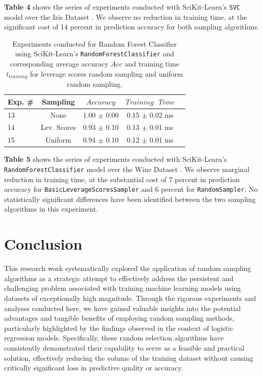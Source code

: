 \documentclass{article}
\theoremstyle{plain}
\theoremstyle{definition}
\theoremstyle{remark}
\begin{document}
\textbf{Table 4} shows the series of experiments conducted with SciKit-Learn's \texttt{SVC} model over the Iris Dataset \cite{iris}. We observe no reduction in training time, at the significant cost of 14 percent in prediction accuracy for both sampling algorithms.

\begin{table}[t]
	\caption{Experiments conducted for Random Forest Classifier using SciKit-Learn's \texttt{RandomForestClassifier} and corresponding average accuracy $Acc$ and training time $t_{training}$ for leverage scores random sampling and uniform random sampling.}
	\label{t5}
	\vskip 0.15in
	\begin{center}
		\begin{small}
			\begin{sc}
				\begin{tabular}{lcccr}
					\toprule
					Exp. \# & Sampling & $Accuracy$ & $Training \text{ } Time$\\
					\midrule
					13 & None & 1.00 $\pm$ 0.00 & 0.15 $\pm$ 0.02 ms \\
					14 & Lev. Scores & 0.93 $\pm$ 0.10 & 0.13 $\pm$ 0.01 ms \\
					15 & Uniform & 0.94 $\pm$ 0.10 & 0.12 $\pm$ 0.01 ms \\
					\bottomrule
				\end{tabular}
			\end{sc}
		\end{small}
	\end{center}
	\vskip -0.1in
\end{table}

\textbf{Table 5} shows the series of experiments conducted with SciKit-Learn's \texttt{RandomForestClassifier} model over the Wine Dataset \cite{wine}. We observe marginal reduction in training time, at the substantial cost of 7 percent in prediction accuracy for \texttt{BasicLeverageScoresSampler} and 6 percent for \texttt{RandomSampler}. No statistically significant differences have been identified between the two sampling algorithms in this experiment.


\section{Conclusion}

This research work systematically explored the application of random sampling algorithms as a strategic attempt to effectively address the persistent and challenging problem associated with training machine learning models using datasets of exceptionally high magnitude. Through the rigorous experiments and analyses conducted here, we have gained valuable insights into the potential advantages and tangible benefits of employing random sampling methods, particularly highlighted by the findings observed in the context of logistic regression models. Specifically, these random selection algorithms have consistently demonstrated their capability to serve as a feasible and practical solution, effectively reducing the volume of the training dataset without causing critically significant loss in predictive quality or accuracy. 
\end{document}
